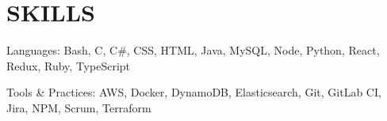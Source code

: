 \section{SKILLS}
\begin{bulletlist}
   \item{Languages: Bash, C, C\#, CSS, HTML, Java, MySQL, Node, Python, React, Redux, Ruby, TypeScript}
   \item{Tools \& Practices: AWS, Docker, DynamoDB, Elasticsearch, Git, GitLab CI, Jira, NPM, Scrum, Terraform}
\end{bulletlist}

